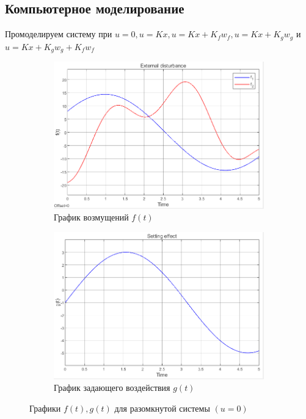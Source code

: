 \documentclass[a4paper, 12pt]{article}
\begin{document}
    \subsection{Компьютерное моделирование}
    Промоделируем систему при $u=0,u=Kx,u=Kx+K_fw_f,u=Kx+K_gw_g$ и $u=Kx+K_gw_g+K_fw_f$
    \begin{figure}[H]
        \centering
        \begin{subfigure}{0.45\textwidth}
            \centering
            \includegraphics[width=\linewidth]{1task_f.png}
            \caption{График возмущений $f(t)$}
            \label{fig:1task_f}
        \end{subfigure}
        \hspace{5mm}
        \begin{subfigure}{0.45\textwidth}
            \centering
            \includegraphics[width=\linewidth]{1task_g.png}
            \caption{График задающего воздействия $g(t)$}
            \label{fig:1task_g}
        \end{subfigure}
        \caption{Графики $f(t),g(t)$ для разомкнутой системы $\left( u=0 \right)$}
        \label{fig:1task_fg}
    \end{figure}
\end{document}
